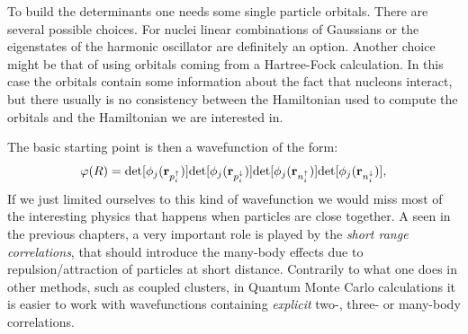 To build the determinants one needs some single particle orbitals. There are several possible choices. For nuclei linear combinations of Gaussians or the eigenstates of the harmonic oscillator are definitely an option. Another choice might be that of using orbitals coming from a Hartree-Fock calculation. In this case the orbitals contain some information about the fact that nucleons interact, but there usually is no consistency between the Hamiltonian used to compute the orbitals and the Hamiltonian we are interested in.

The basic starting point is then a wavefunction of the form:
\begin{equation}
\varphi(R)=\text{det}[\phi_j({\bf r}_{p^\uparrow_i})]\text{det}[\phi_j({\bf  r}_{p^\downarrow_i})]\text{det}[\phi_j({\bf r}_{n^\uparrow_i})]\text{det}[\phi_j({\bf r}_{n^\downarrow_i})],
\end{equation}
If we just limited ourselves to this kind of wavefunction we would miss most of the interesting physics that happens when particles are close together. A seen in the previous chapters, a very important role is played by the {\it short range correlations}, that should introduce the many-body effects due to repulsion/attraction of particles at short distance. Contrarily to what one does in other methods, such as coupled clusters, in Quantum Monte Carlo calculations it is easier to work with wavefunctions containing {\it explicit} two-, three- or many-body correlations. 

